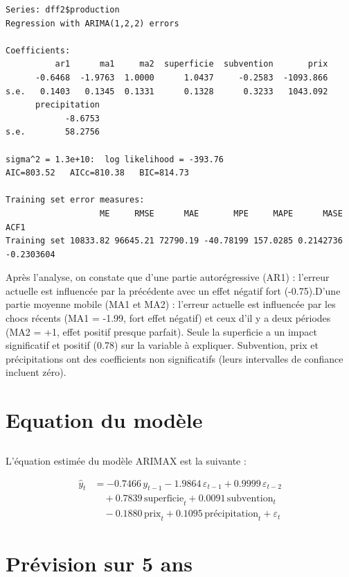 \documentclass[
  letterpaper,
  DIV=11,
  numbers=noendperiod]{scrartcl}
\begin{document}
\begin{verbatim}
Series: dff2$production 
Regression with ARIMA(1,2,2) errors 

Coefficients:
          ar1      ma1     ma2  superficie  subvention       prix
      -0.6468  -1.9763  1.0000      1.0437     -0.2583  -1093.866
s.e.   0.1403   0.1345  0.1331      0.1328      0.3233   1043.092
      precipitation
            -8.6753
s.e.        58.2756

sigma^2 = 1.3e+10:  log likelihood = -393.76
AIC=803.52   AICc=810.38   BIC=814.73

Training set error measures:
                   ME     RMSE      MAE       MPE     MAPE      MASE       ACF1
Training set 10833.82 96645.21 72790.19 -40.78199 157.0285 0.2142736 -0.2303604
\end{verbatim}

Après l'analyse, on constate que d'une partie autorégressive (AR1) :
l'erreur actuelle est influencée par la précédente avec un effet négatif
fort (-0.75).D'une partie moyenne mobile (MA1 et MA2) : l'erreur
actuelle est influencée par les chocs récents (MA1 = -1.99, fort effet
négatif) et ceux d'il y a deux périodes (MA2 = +1, effet positif presque
parfait). Seule la superficie a un impact significatif et positif (0.78)
sur la variable à expliquer. Subvention, prix et précipitations ont des
coefficients non significatifs (leurs intervalles de confiance incluent
zéro).

\section{Equation du modèle}\label{equation-du-moduxe8le}

\subsection{}\label{section}

L'équation estimée du modèle ARIMAX est la suivante :

\[
\begin{align*}
\hat{y}_t &= -0.7466\, y_{t-1} - 1.9864\, \varepsilon_{t-1} + 0.9999\, \varepsilon_{t-2} \\
&\quad + 0.7839\, \text{superficie}_t + 0.0091\, \text{subvention}_t \\
&\quad - 0.1880\, \text{prix}_t + 0.1095\, \text{précipitation}_t + \varepsilon_t
\end{align*}
\]

\section{Prévision sur 5 ans}\label{pruxe9vision-sur-5-ans}
\end{document}
